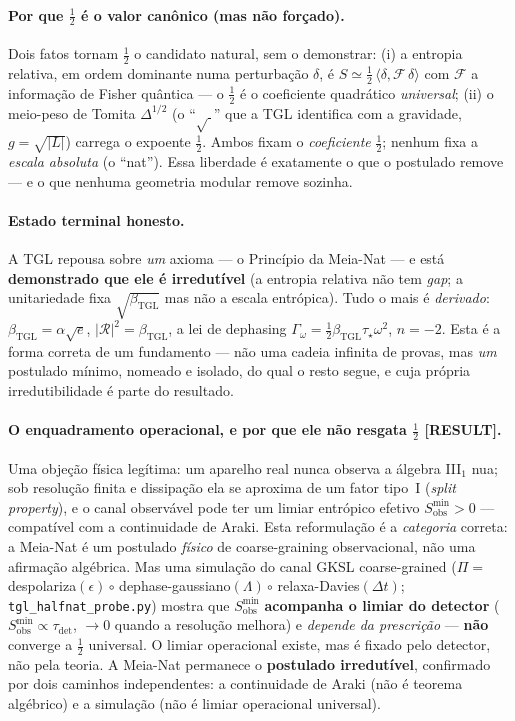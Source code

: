 \documentclass[12pt,a4paper]{article}
\newcommand{\betatgl}{\beta_{\text{TGL}}}
\newcommand{\TGL}{\textsc{TGL}}
\begin{document}
\paragraph{Por que $\tfrac12$ é o valor canônico (mas não forçado).} Dois fatos tornam $\tfrac12$ o candidato natural, sem o demonstrar: (i) a entropia relativa, em ordem dominante numa perturbação $\delta$, é $S\simeq\tfrac12\,\langle\delta,\mathcal F\,\delta\rangle$ com $\mathcal F$ a informação de Fisher quântica --- o $\tfrac12$ é o coeficiente quadrático \emph{universal}; (ii) o meio-peso de Tomita $\Delta^{1/2}$ (o ``$\sqrt{\ }$'' que a \TGL{} identifica com a gravidade, $g=\sqrt{|L|}$) carrega o expoente $\tfrac12$.  Ambos fixam o \emph{coeficiente} $\tfrac12$; nenhum fixa a \emph{escala absoluta} (o ``nat'').  Essa liberdade é exatamente o que o postulado remove --- e o que nenhuma geometria modular remove sozinha.

\paragraph{Estado terminal honesto.} A \TGL{} repousa sobre \emph{um} axioma --- o Princípio da Meia-Nat --- e está \textbf{demonstrado que ele é irredutível} (a entropia relativa não tem \emph{gap}; a unitariedade fixa $\sqrt{\betatgl}$ mas não a escala entrópica).  Tudo o mais é \emph{derivado}: $\betatgl=\alpha\sqrt e$, $|\mathcal R|^2=\betatgl$, a lei de dephasing $\Gamma_\omega=\tfrac12\betatgl\tau_\star\omega^2$, $n=-2$.  Esta é a forma correta de um fundamento --- não uma cadeia infinita de provas, mas \emph{um} postulado mínimo, nomeado e isolado, do qual o resto segue, e cuja própria irredutibilidade é parte do resultado.

\paragraph{O enquadramento operacional, e por que ele não resgata $\tfrac12$ \textbf{[RESULT]}.} Uma objeção física legítima: um aparelho real nunca observa a álgebra III$_1$ nua; sob resolução finita e dissipação ela se aproxima de um fator tipo~I (\emph{split property}), e o canal observável pode ter um limiar entrópico efetivo $S_{\mathrm{obs}}^{\min}>0$ --- compatível com a continuidade de Araki.  Esta reformulação é a \emph{categoria} correta: a Meia-Nat é um postulado \emph{físico} de coarse-graining observacional, não uma afirmação algébrica.  Mas uma simulação do canal GKSL coarse-grained ($\Pi=\,$despolariza$(\epsilon)\circ\,$dephase-gaussiano$(\Lambda)\circ\,$relaxa-Davies$(\Delta t)$; \texttt{tgl\_halfnat\_probe.py}) mostra que $S_{\mathrm{obs}}^{\min}$ \textbf{acompanha o limiar do detector} ($S_{\mathrm{obs}}^{\min}\propto\tau_{\det}$, $\to 0$ quando a resolução melhora) e \emph{depende da prescrição} --- \textbf{não} converge a $\tfrac12$ universal.  O limiar operacional existe, mas é fixado pelo detector, não pela teoria.  A Meia-Nat permanece o \textbf{postulado irredutível}, confirmado por dois caminhos independentes: a continuidade de Araki (não é teorema algébrico) e a simulação (não é limiar operacional universal).
\end{document}
